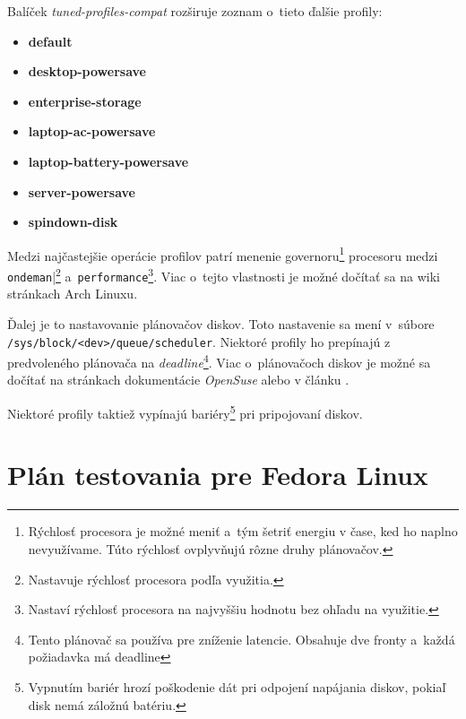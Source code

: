 Balíček \emph{tuned-profiles-compat} rozširuje zoznam o~tieto ďalšie profily:

\begin{itemize}
    \item \textbf{default}
    \item \textbf{desktop-powersave}
    \item \textbf{enterprise-storage}
    \item \textbf{laptop-ac-powersave}
    \item \textbf{laptop-battery-powersave}
    \item \textbf{server-powersave}
    \item \textbf{spindown-disk}
\end{itemize}

Medzi najčastejšie operácie profilov patrí menenie governoru\footnote{Rýchlosť
procesora je možné meniť a~tým šetriť energiu v čase, ked ho naplno
nevyužívame. Túto rýchlosť ovplyvňujú rôzne druhy plánovačov.} procesoru medzi
\texttt{ondeman}|\footnote{Nastavuje rýchlosť procesora podľa využitia.}
a~\texttt{performance}\footnote{Nastaví rýchlosť procesora na najvyššiu hodnotu
bez ohľadu na využitie.}. Viac o~tejto vlastnosti je možné dočítať sa na wiki
stránkach Arch Linuxu\cite{arch:governor}.

Ďalej je to nastavovanie plánovačov diskov. Toto nastavenie sa mení v~súbore
\texttt{/sys\-/block\-/<dev>\-/queue\-/scheduler}. Niektoré profily ho prepínajú z
predvoleného plánovača na \emph{deadline}\footnote{Tento plánovač sa používa
pre zníženie latencie. Obsahuje dve fronty a~každá požiadavka má deadline}.
Viac o~plánovačoch diskov je možné sa dočítať na stránkach dokumentácie
\emph{OpenSuse}\cite{suse:scheduler} alebo v článku \cite{book:scheduler}.

Niektoré profily taktiež vypínajú bariéry\footnote{Vypnutím bariér hrozí
poškodenie dát pri odpojení napájania diskov, pokiaľ disk nemá záložnú
batériu.} pri pripojovaní diskov. 

%
%

\chapter{Plán testovania pre Fedora Linux}


